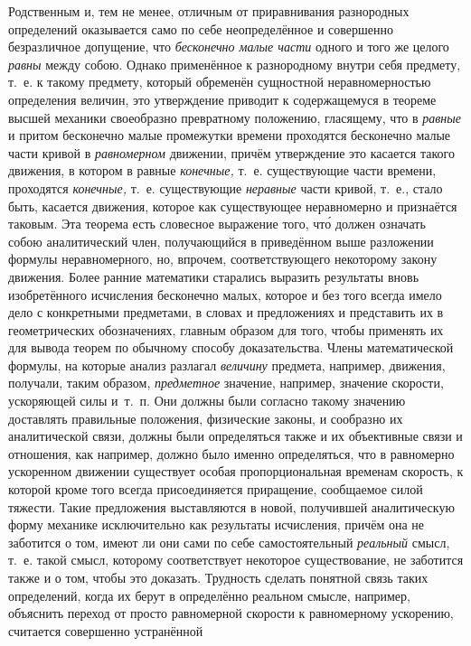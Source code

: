 Родственным и, тем не менее, отличным от приравнивания разнородных определений
оказывается само по себе неопределённое и совершенно безразличное допущение,
что {\em бесконечно малые части} одного и того же целого {\em равны} между
собою. Однако применённое к разнородному внутри себя предмету, т.~е. к такому
предмету, который обременён сущностной неравномерностью определения
величин, это утверждение приводит к содержащемуся в теореме высшей механики
своеобразно превратному положению, гласящему, что в {\em равные} и притом
бесконечно малые промежутки времени проходятся бесконечно малые части кривой
в {\em равномерном} движении, причём утверждение это касается такого движения,
в котором в равные {\em конечные,} т.~е. существующие части времени, проходятся
{\em конечные,} т.~е. существующие {\em неравные} части кривой, т.~е., стало
быть, касается движения, которое как существующее неравномерно и признаётся
таковым. Эта теорема есть словесное выражение того, чт\'{о} должен означать собою
аналитический член, получающийся в приведённом выше разложении формулы
неравномерного, но, впрочем, соответствующего некоторому закону движения. Более
ранние математики старались выразить результаты вновь изобретённого исчисления
бесконечно малых, которое и без того всегда имело дело с конкретными
предметами, в словах и предложениях и представить их в геометрических
обозначениях, главным образом для того, чтобы применять их для вывода теорем по
обычному способу доказательства. Члены математической формулы, на которые
анализ разлагал {\em величину} предмета, например, движения, получали, таким
образом, {\em предметное} значение, например, значение скорости, ускоряющей
силы и~т.~п. Они должны были согласно такому значению доставлять правильные
положения, физические законы, и сообразно их аналитической связи, должны были
определяться также и их объективные связи и отношения, как например, должно
было именно определяться, что в равномерно ускоренном движении существует
особая пропорциональная временам скорость, к которой кроме того всегда
присоединяется приращение, сообщаемое силой тяжести. Такие предложения
выставляются в новой, получившей аналитическую форму механике исключительно как
результаты исчисления, причём она не заботится о том, имеют ли они сами по себе
самостоятельный {\em реальный} смысл, т.~е. такой смысл, которому соответствует
некоторое существование, не заботится также и о том, чтобы это доказать.
Трудность сделать понятной связь таких определений, когда их берут в
определённо реальном смысле, например, объяснить переход от просто равномерной
скорости к равномерному ускорению, считается совершенно устранённой
